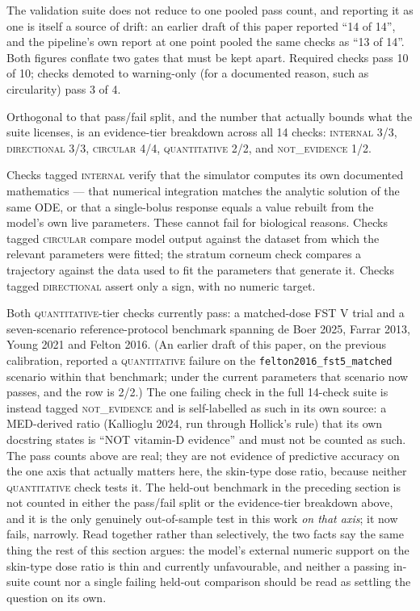 \documentclass[11pt]{article}
\begin{document}
The validation suite does not reduce to one pooled pass count, and
reporting it as one is itself a source of drift: an earlier draft of
this paper reported ``14 of 14'', and the pipeline's own report at one
point pooled the same checks as ``13 of 14''. Both figures conflate
two gates that must be kept apart. Required checks pass 10 of 10;
checks demoted to warning-only (for a documented reason, such as
circularity) pass 3 of 4.

Orthogonal to that pass/fail split, and the number that actually
bounds what the suite licenses, is an evidence-tier breakdown across
all 14 checks: \textsc{internal} 3/3, \textsc{directional} 3/3,
\textsc{circular} 4/4, \textsc{quantitative} 2/2, and
\textsc{not\_evidence} 1/2.

Checks tagged \textsc{internal} verify that the simulator computes its
own documented mathematics --- that numerical integration matches the
analytic solution of the same ODE, or that a single-bolus response
equals a value rebuilt from the model's own live parameters. These
cannot fail for biological reasons. Checks tagged \textsc{circular}
compare model output against the dataset from which the relevant
parameters were fitted; the stratum corneum check compares a
trajectory against the data used to fit the parameters that generate
it. Checks tagged \textsc{directional} assert only a sign, with no
numeric target.

Both \textsc{quantitative}-tier checks currently pass: a matched-dose
FST V trial \citep{farrar2013} and a seven-scenario reference-protocol
benchmark spanning de Boer 2025, Farrar 2013, Young 2021 and Felton
2016. (An earlier draft of this paper, on the previous calibration,
reported a \textsc{quantitative} failure on the
\texttt{felton2016\_fst5\_matched} scenario within that benchmark;
under the current parameters that scenario now passes, and the row is
2/2.) The one failing check in the full 14-check suite is instead
tagged \textsc{not\_evidence} and is self-labelled as such in its own
source: a MED-derived ratio (Kallioglu 2024, run through Hollick's
rule) that its own docstring states is ``NOT vitamin-D evidence'' and
must not be counted as such. The pass counts above are real; they are
not evidence of predictive accuracy on the one axis that actually
matters here, the skin-type dose ratio, because neither
\textsc{quantitative} check tests it. The held-out benchmark in the
preceding section is not counted in either the pass/fail split or the
evidence-tier breakdown above, and it is the only genuinely
out-of-sample test in this work \emph{on that axis}; it now fails,
narrowly. Read together rather than selectively, the two facts say the
same thing the rest of this section argues: the model's external
numeric support on the skin-type dose ratio is thin and currently
unfavourable, and neither a passing in-suite count nor a single
failing held-out comparison should be read as settling the question on
its own.
\end{document}
